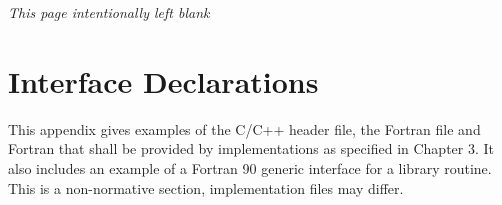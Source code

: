 %
%
%
%
%
%
%
%
%
%



\clearpage
\thispagestyle{empty}
\phantom{a}
\emph{This page intentionally left blank}
\vfill




\chapter{Interface Declarations}
\label{chap:Interface Declarations}
This appendix gives examples of the C/C++ header file, the Fortran  file and 
Fortran  that shall be provided by implementations as specified in Chapter 3. It 
also includes an example of a Fortran 90 generic interface for a library routine. This is a 
non-normative section, implementation files may differ.




\pagebreak

